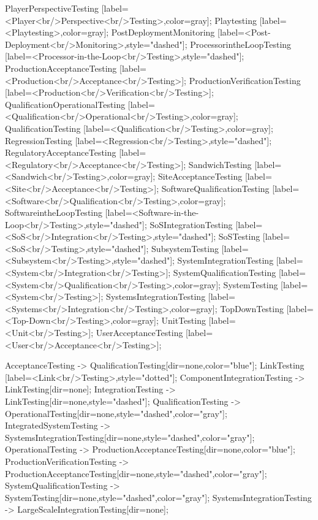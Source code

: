 \documentclass{article}
\begin{document}
{PlayerPerspectiveTesting [label=<Player<br/>Perspective<br/>Testing>,color=gray];
Playtesting [label=<Playtesting>,color=gray];
PostDeploymentMonitoring [label=<Post-Deployment<br/>Monitoring>,style="dashed"];
ProcessorintheLoopTesting [label=<Processor-in-the-Loop<br/>Testing>,style="dashed"];
ProductionAcceptanceTesting [label=<Production<br/>Acceptance<br/>Testing>];
ProductionVerificationTesting [label=<Production<br/>Verification<br/>Testing>];
QualificationOperationalTesting [label=<Qualification<br/>Operational<br/>Testing>,color=gray];
QualificationTesting [label=<Qualification<br/>Testing>,color=gray];
RegressionTesting [label=<Regression<br/>Testing>,style="dashed"];
RegulatoryAcceptanceTesting [label=<Regulatory<br/>Acceptance<br/>Testing>];
SandwichTesting [label=<Sandwich<br/>Testing>,color=gray];
SiteAcceptanceTesting [label=<Site<br/>Acceptance<br/>Testing>];
SoftwareQualificationTesting [label=<Software<br/>Qualification<br/>Testing>,color=gray];
SoftwareintheLoopTesting [label=<Software-in-the-Loop<br/>Testing>,style="dashed"];
SoSIntegrationTesting [label=<SoS<br/>Integration<br/>Testing>,style="dashed"];
SoSTesting [label=<SoS<br/>Testing>,style="dashed"];
SubsystemTesting [label=<Subsystem<br/>Testing>,style="dashed"];
SystemIntegrationTesting [label=<System<br/>Integration<br/>Testing>];
SystemQualificationTesting [label=<System<br/>Qualification<br/>Testing>,color=gray];
SystemTesting [label=<System<br/>Testing>];
SystemsIntegrationTesting [label=<Systems<br/>Integration<br/>Testing>,color=gray];
TopDownTesting [label=<Top-Down<br/>Testing>,color=gray];
UnitTesting [label=<Unit<br/>Testing>];
UserAcceptanceTesting [label=<User<br/>Acceptance<br/>Testing>];

AcceptanceTesting -> QualificationTesting[dir=none,color="blue"];
LinkTesting [label=<Link<br/>Testing>,style="dotted"];
ComponentIntegrationTesting -> LinkTesting[dir=none];
IntegrationTesting -> LinkTesting[dir=none,style="dashed"];
QualificationTesting -> OperationalTesting[dir=none,style="dashed",color="gray"];
IntegratedSystemTesting -> SystemsIntegrationTesting[dir=none,style="dashed",color="gray"];
OperationalTesting -> ProductionAcceptanceTesting[dir=none,color="blue"];
ProductionVerificationTesting -> ProductionAcceptanceTesting[dir=none,style="dashed",color="gray"];
SystemQualificationTesting -> SystemTesting[dir=none,style="dashed",color="gray"];
SystemsIntegrationTesting -> LargeScaleIntegrationTesting[dir=none];

}
\end{document}
